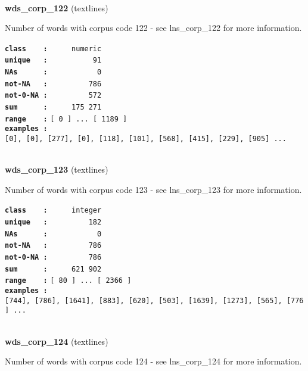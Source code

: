 \documentclass[]{article}
\begin{document}
~

\textbf{wds\_corp\_122} (textlines)

Number of words with corpus code 122 - see lns\_corp\_122 for more
information.

\textbf{\texttt{class\ \ \ \ :}} \texttt{~~~~~numeric}\\
\textbf{\texttt{unique\ \ \ :}} \texttt{~~~~~~~~~~91}\\
\textbf{\texttt{NAs\ \ \ \ \ \ :}} \texttt{~~~~~~~~~~~0}\\
\textbf{\texttt{not-NA\ \ \ :}} \texttt{~~~~~~~~~786}\\
\textbf{\texttt{not-0-NA\ :}} \texttt{~~~~~~~~~572}\\
\textbf{\texttt{sum\ \ \ \ \ \ :}} \texttt{~~~~~175~271}\\
\textbf{\texttt{range\ \ \ \ :}}
\texttt{{[}\ 0\ {]}\ ...\ {[}\ 1189\ {]}}\\
\textbf{\texttt{examples\ :}}
\texttt{{[}0{]},\ {[}0{]},\ {[}277{]},\ {[}0{]},\ {[}118{]},\ {[}101{]},\ {[}568{]},\ {[}415{]},\ {[}229{]},\ {[}905{]}\ ...}\\

~

\textbf{wds\_corp\_123} (textlines)

Number of words with corpus code 123 - see lns\_corp\_123 for more
information.

\textbf{\texttt{class\ \ \ \ :}} \texttt{~~~~~integer}\\
\textbf{\texttt{unique\ \ \ :}} \texttt{~~~~~~~~~182}\\
\textbf{\texttt{NAs\ \ \ \ \ \ :}} \texttt{~~~~~~~~~~~0}\\
\textbf{\texttt{not-NA\ \ \ :}} \texttt{~~~~~~~~~786}\\
\textbf{\texttt{not-0-NA\ :}} \texttt{~~~~~~~~~786}\\
\textbf{\texttt{sum\ \ \ \ \ \ :}} \texttt{~~~~~621~902}\\
\textbf{\texttt{range\ \ \ \ :}}
\texttt{{[}\ 80\ {]}\ ...\ {[}\ 2366\ {]}}\\
\textbf{\texttt{examples\ :}}
\texttt{{[}744{]},\ {[}786{]},\ {[}1641{]},\ {[}883{]},\ {[}620{]},\ {[}503{]},\ {[}1639{]},\ {[}1273{]},\ {[}565{]},\ {[}776{]}\ ...}\\

~

\textbf{wds\_corp\_124} (textlines)

Number of words with corpus code 124 - see lns\_corp\_124 for more
information.
\end{document}
